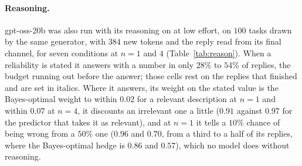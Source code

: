 \documentclass{article}
\begin{document}
\begin{table}[!htb]
\centering\footnotesize
\caption{\textbf{The wording of the description sets how much a model relies on it, but under no wording does the weight follow the stated specificity.} Weight on the stated value for the three relevant descriptions at $n = 1$ and $4$ under four wordings (written readout, $2{,}000$ tasks). Number: the share of replies with a number; italics: below three quarters in that cell. The Bayes-optimal weight is $0.50$, $0.80$, and $0.97$ at $n = 1$ and $0.20$, $0.50$, and $0.90$ at $n = 4$.}
\label{tab:paraphrase}
\vspace{3pt}

\end{table}

\paragraph{Reasoning.} gpt-oss-20b was also run with its reasoning on at low effort, on $100$ tasks drawn by the same generator, with $384$ new tokens and the reply read from its final channel, for seven conditions at $n = 1$ and $4$ (Table~\ref{tab:reason}). When a reliability is stated it answers with a number in only $28\%$ to $54\%$ of replies, the budget running out before the answer; those cells rest on the replies that finished and are set in italics. Where it answers, its weight on the stated value is the Bayes-optimal weight to within $0.02$ for a relevant description at $n = 1$ and within $0.07$ at $n = 4$, it discounts an irrelevant one a little ($0.91$ against $0.97$ for the predictor that takes it as relevant), and at $n = 1$ it tells a $10\%$ chance of being wrong from a $50\%$ one ($0.96$ and $0.70$, from a third to a half of its replies, where the Bayes-optimal hedge is $0.86$ and $0.57$), which no model does without reasoning.

\begin{table}[!htb]
\centering\small
\caption{\textbf{With reasoning, gpt-oss-20b puts the Bayes-optimal weight on the stated value.} Low reasoning effort, $100$ tasks, $\sigma = 60$. Number: the fraction of replies that are a number. Weight and error: the model's against the Bayes-optimal predictor's, which hedges with the stated $p$ where one is given. Italics: fewer than three quarters of the replies are a number.}
\label{tab:reason}
\vspace{3pt}

\end{table}
\end{document}
